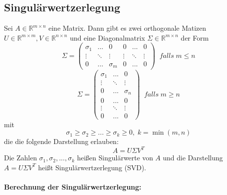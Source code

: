 \documentclass[a4paper,twocolumn,10pt]{article}
\begin{document}
\subsection{Singulärwertzerlegung}
Sei $A\in\mathbb{R}^{m\times n}$ eine Matrix. Dann gibt es zwei orthogonale Matizen $U\in\mathbb{R}^{m\times m},V\in\mathbb{R}^{n\times n}$ und eine Diagonalmatrix $\Sigma\in\mathbb{R}^{m\times n}$ der Form
\begin{equation*}
\Sigma =\begin{pmatrix}\sigma_1 & ... & 0 & 0 & ... & 0 \\ \vdots & \ddots & \vdots & \vdots & \ddots & \vdots \\ 0 & ... & \sigma_m & 0 & ... & 0\end{pmatrix}\;\;falls\;m\leq n
\end{equation*}
\begin{equation*}
\Sigma = \begin{pmatrix}\sigma_1 & ... & 0 \\ \vdots & \ddots & \vdots \\ 0 & ... & \sigma_n \\ 0 & ... & 0 \\ \vdots & \ddots & \vdots \\ 0 & ... & 0\end{pmatrix}\;\;falls\;m\geq n
\end{equation*}
mit
\begin{equation*}
\sigma_1\geq\sigma_2\geq ...\geq\sigma_k\geq 0,\;k=\min(m,n)
\end{equation*}
die die folgende Darstellung erlauben:
\begin{equation*}
A=U\Sigma V^T
\end{equation*}
Die Zahlen $\sigma_1,\sigma_2,...,\sigma_k$ heißen Singulärwerte von $A$ und die Darstellung $A=U\Sigma V^T$ heißt Singulärwertzerlegung (SVD).\\\\
\textbf{Berechnung der Singulärwertzerlegung:}\\
\end{document}
